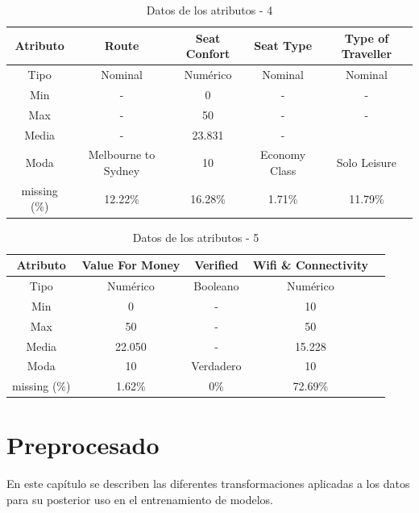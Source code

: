 \documentclass[es]{uc3mreport}
\begin{document}
\begin{report}
\begin{table}[H]
\begin{tabular}{@{}ccccc@{}}
        \toprule
        Atributo     & Route               & Seat Confort & Seat Type     & Type of Traveller \\
        \midrule
        Tipo         & Nominal             & Numérico     & Nominal       & Nominal           \\
        Min          & -                   & 0            & -             & -                 \\
        Max          & -                   & 50           & -             & -                 \\
        Media        & -                   & 23.831       & -             &                   \\
        Moda         & Melbourne to Sydney & 10           & Economy Class & Solo Leisure      \\
        missing (\%) & 12.22\%             & 16.28\%      & 1.71\%        & 11.79\%           \\
        \bottomrule
    \end{tabular}
    \caption{Datos de los atributos - 4}
\end{table}
\begin{table}[H]
    \center
    \begin{tabular}{@{}ccccc@{}}
        \toprule
        Atributo     & Value For Money & Verified  & Wifi \& Connectivity \\
        \midrule
        Tipo         & Numérico        & Booleano  & Numérico             \\
        Min          & 0               & -         & 10                   \\
        Max          & 50              & -         & 50                   \\
        Media        & 22.050          & -         & 15.228               \\
        Moda         & 10              & Verdadero & 10                   \\
        missing (\%) & 1.62\%          & 0\%       & 72.69\%              \\
        \bottomrule
    \end{tabular}
    \caption{Datos de los atributos - 5}
\end{table}

\section{Preprocesado}
\label{chap:preprocess}
En este capítulo se describen las diferentes transformaciones aplicadas a los datos para su posterior uso en el entrenamiento de modelos.


\end{report}
\end{document}
